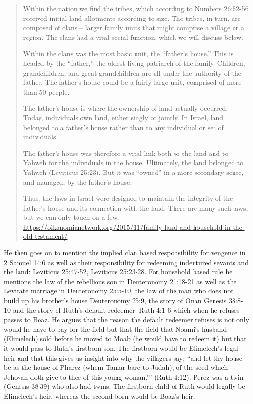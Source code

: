 \documentclass[11pt]{article}
\begin{document}
\begin{quote}
Within the nation we find the tribes, which according to Numbers 26:52-56 received initial land allotments according to size. The tribes, in turn, are composed of clans – larger family units that might comprise a village or a region. The clans had a vital social function, which we will discuss below.

Within the clans was the most basic unit, the “father’s house.” This is headed by the “father,” the oldest living patriarch of the family. Children, grandchildren, and great-grandchildren are all under the authority of the father. The father’s house could be a fairly large unit, comprised of more than 50 people.

The father’s house is where the ownership of land actually occurred. Today, individuals own land, either singly or jointly. In Israel, land belonged to a father’s house rather than to any individual or set of individuals.

The father’s house was therefore a vital link both to the land and to Yahweh for the individuals in the house. Ultimately, the land belonged to Yahweh (Leviticus 25:23). But it was “owned” in a more secondary sense, and managed, by the father’s house.

Thus, the laws in Israel were designed to maintain the integrity of the father’s house and its connection with the land. There are many such laws, but we can only touch on a few. \url{https://oikonomianetwork.org/2015/11/family-land-and-household-in-the-old-testament/}
\end{quote}

He then goes on to mention the implied clan based responsibility for vengence in 2 Samuel 14:6 as well as their responsibility for redeeming indentured sevants and the land: Leviticus 25:47-52, Leviticus 25:23-28. For household based rule he mentions the law of the rebellious son in Deuteronomy 21:18-21 as well as the Levirate marriage in Deuteronomy 25:5-10, the law of the man who does not build up his brother's house Deuteronomy 25:9, the story of Onan Genesis 38:8-10 and the story of Ruth's default redeemer: Ruth 4:1-6 which when he refuses passes to Boaz. He argues that the reason the default redeemer refuses is not only would he have to pay for the field but that the field that Noami's husband (Elimelech) sold before he moved to Moab (he would have to redeem it) but that it would pass to Ruth's firstborn son. The firstborn would be Elimelech's legal heir and that this gives us insight into why the villagers say: “and let thy house be as the house of Pharez (whom Tamar bare to Judah), of the seed which Jehovah doth give to thee of this young woman.'” (Ruth 4:12). Perez was a twin (Genesis 38:39) who also had twins. The firstborn child of Ruth would legally be Elimelech’s heir, whereas the second born would be Boaz’s heir. 
\end{document}
